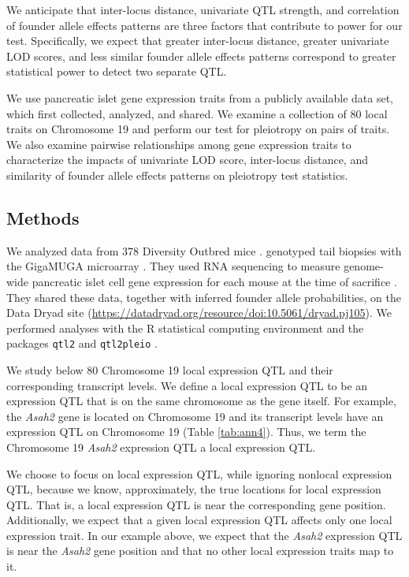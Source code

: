 \documentclass[oneside]{book}
\begin{document}
We anticipate that inter-locus distance, univariate QTL strength, and correlation of founder allele effects patterns are three factors that contribute to power for our test. 
Specifically, we expect that greater inter-locus distance, greater univariate LOD scores, and less similar founder allele effects patterns correspond to greater statistical power to detect two separate QTL.

We use pancreatic islet gene expression traits from a publicly available data set, which \citet{keller2018genetic} first collected, analyzed, and shared. 
We examine a collection of 80 local traits on Chromosome 19 and perform our test for pleiotropy on pairs of traits. 
We also examine pairwise relationships among gene expression traits to characterize the impacts of univariate LOD score, 
inter-locus distance, and similarity of founder allele effects patterns on pleiotropy test statistics.



\subsection{Methods}


We analyzed data from 378 Diversity Outbred mice \citep{keller2018genetic}. \citet{keller2018genetic} genotyped tail biopsies with the GigaMUGA microarray \citep{morgan2016mouse}. They used RNA sequencing to measure genome-wide pancreatic islet cell gene expression for each mouse at the time of sacrifice \citep{keller2018genetic}. They shared these data, together with inferred founder allele probabilities, on the Data Dryad site (\url{https://datadryad.org/resource/doi:10.5061/dryad.pj105}). We performed analyses with the R statistical computing environment \citep{r} and the packages \texttt{qtl2} \citep{qtl2} and \texttt{qtl2pleio} \citep{qtl2pleio}.


We study below 80 Chromosome 19 local expression QTL and their corresponding transcript levels. We define a local expression QTL to be an expression QTL that is on the same chromosome as the gene itself. For example, the \emph{Asah2} gene is located on Chromosome 19 and its transcript levels have an expression QTL on Chromosome 19 (Table \ref{tab:ann4}). Thus, we term the Chromosome 19 \emph{Asah2} expression QTL a local expression QTL.

We choose to focus on local expression QTL, while ignoring nonlocal expression QTL, 
because we know, approximately, the true locations for local expression QTL. 
That is, a local expression QTL is near the corresponding gene position. 
Additionally, we expect that a given local expression QTL affects only one local expression trait. 
In our example above, we expect that the \emph{Asah2} expression QTL is near the \emph{Asah2} gene 
position and that no other local expression traits map to it.
\end{document}
